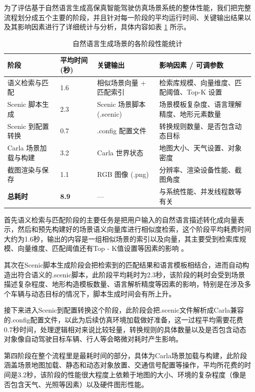 为了评估基于自然语言生成高保真智能驾驶仿真场景系统的整体性能，我们把完整流程划分成五个主要的阶段，并且针对每一阶段的平均运行时间、关键输出结果以及其影响因素进行了详细统计与分析，具体内容如表 \ref{tab:simulation_time} 所示。
\begin{table}[H]
	\centering
	\renewcommand{\arraystretch}{1.2}
	\begin{tabular}{p{4cm} p{2.5cm} p{2.8cm} p{4.5cm}}
		\hline
		\textbf{阶段} & \textbf{平均时间 (秒)} & \textbf{关键输出} & \textbf{影响因素 / 可调参数} \\
		\hline
		语义检索与匹配 & 1.6 & 相似场景向量 + 匹配索引 & 检索库规模、向量维度、匹配阈值、Top-K 设置 \\
		Scenic 脚本生成 & 2.3 & Scenic 场景脚本 (.scenic) & 场景模板复杂度、语言理解精度、地形元素数量 \\
		Scenic 到配置转换 & 0.7 & .config 配置文件 & 转换规则数量、是否包含动态目标 \\
		Carla 场景加载与构建 & 3.2 & Carla 世界状态 & 地图大小、天气设置、对象密度 \\
		截图渲染与保存 & 1.1 & RGB 图像 (.png) & 分辨率、渲染设备性能、截图角度 \\
		\hline
		\textbf{总耗时} & \textbf{8.9} & --- & 与系统性能、并发线程数等有关 \\
		\hline
	\end{tabular}
	\caption{自然语言生成场景的各阶段性能统计}
	\label{tab:simulation_time}
\end{table}
首先语义检索与匹配阶段的主要任务是把用户输入的自然语言描述转化成向量表示，然后和预先构建好的场景语义向量库进行相似度检索，这个阶段平均耗费时间大约为1.6秒，输出的内容是一组相似场景的索引以及向量，其主要受到检索库规模、向量维度、匹配阈值还有Top - K值设置等因素的影响 。

其次在Scenic脚本生成阶段会把检索到的匹配结果和语言模板相结合，进而自动构造出符合语义的.scenic脚本，此阶段平均耗时为2.3秒，该阶段的耗时会受到场景描述复杂程度、地形构造模板数量、语言解析精度等因素的影响，特别是在涉及多个车辆与动态目标的情况下，脚本生成时间会有所上升。

接下来进入Scenic到配置转换这个阶段，此阶段会把.scenic文件解析成Carla兼容的.config配置文件，以此为后续仿真环境加载做好准备，这一过程平均需要花费0.7秒时间，处理逻辑相对来说比较轻量，转换规则的具体数量以及是否包含动态对象像自动驾驶目标车辆、行人等会略微对耗时产生影响。

第四阶段在整个流程里是最耗时间的部分，具体为Carla场景加载与构建，此阶段涵盖场景地图加载、静态和动态对象放置、交通信号配置等操作，平均所花费的时间是3.2秒，该阶段的性能很大程度上依赖于地图的大小、环境的复杂程度（像是否包含天气、光照等因素）以及硬件图形性能。

